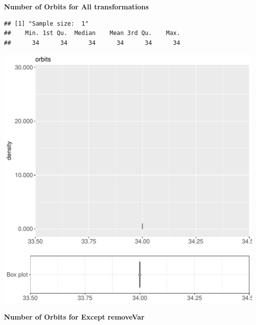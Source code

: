 \documentclass{article}\usepackage[]{graphicx}\usepackage[]{color}
\makeatletter
\def\maxwidth{ %
  \ifdim\Gin@nat@width>\linewidth
    \linewidth
  \else
    \Gin@nat@width
  \fi
}
\newenvironment{kframe}{%
 \def\at@end@of@kframe{}%
 \ifinner\ifhmode%
  \def\at@end@of@kframe{\end{minipage}}%
  \begin{minipage}{\columnwidth}%
 \fi\fi%
 \def\FrameCommand##1{\hskip\@totalleftmargin \hskip-\fboxsep
 \colorbox{shadecolor}{##1}\hskip-\fboxsep
     \hskip-\linewidth \hskip-\@totalleftmargin \hskip\columnwidth}%
 \MakeFramed {\advance\hsize-\width
   \@totalleftmargin\z@ \linewidth\hsize
   \@setminipage}}%
 {\par\unskip\endMakeFramed%
 \at@end@of@kframe}
\newenvironment{knitrout}{}{} %
\makeatother
\begin{document}
 \textbf{Number of Orbits for All transformations}
\begin{knitrout}
\color{fgcolor}\begin{kframe}
\begin{verbatim}
## [1] "Sample size:  1"
##    Min. 1st Qu.  Median    Mean 3rd Qu.    Max. 
##      34      34      34      34      34      34
\end{verbatim}


{\ttfamily\noindent\bfseries{}}\end{kframe}
\includegraphics[width=\maxwidth]{figure/RH6_cashew_big-1} 

\end{knitrout}
 \textbf{Number of Orbits for Except removeVar}
\end{document}
